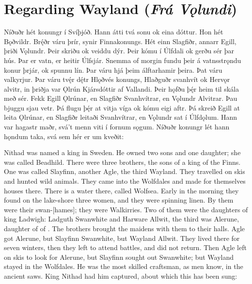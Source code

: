\sectionline

\section{Regarding Wayland (\emph{Frá Vǫlundi})}

\bpg\bpa Níðuðr hét konungr í Svíþjóð.
Hann átti tvá sonu ok eina dóttur. Hon hét Bǫðvildr.
Brę́ðr váru þrír, synir Finnakonungs.
Hét einn Slagfiðr, annarr Egill, þriði Vǫlundr.
Þeir skriðu ok veiddu dýr. Þeir kómu í Úlfdali ok gerðu sér þar hús.
Þar er vatn, er heitir Úlfsjár.
Snemma of morgin fundu þeir á vatnsstrǫndu konur þrjár, ok spunnu lín.
Þar váru hjá þeim álftarhamir þeira. Þat váru valkyrjur.
Þar váru tvę́r dę́tr Hlǫðvés konungs, Hlaðguðr svanhvít ok Hervǫr alvitr, in þriðja var Ǫlrún Kjársdóttir af Vallandi.
Þeir hǫfðu þę́r heim til skála með sér. Fekk Egill Ǫlrúnar, en Slagfiðr Svanhvítrar, en Vǫlundr Alvitrar.
Þau bjuggu sjau vetr. Þá flugu þę́r at vitja víga ok kómu eigi aftr.
Þá skreið Egill at leita Ǫlrúnar, en Slagfiðr leitaði Svanhvítrar, en Vǫlundr sat í Úlfdǫlum.
Hann var hagastr maðr, svá’t menn viti í fornum sǫgum.
Níðuðr konungr lét hann hǫndum taka, svá sem hér er um kveðit:\epa

\bpb Nithad was named a king in Sweden.
He owned two sons and one daughter; she was called Beadhild.
There were three brothers, the sons of a king of the Finns.
One was called Slayfinn, another Agle, the third Wayland.
They travelled on skis and hunted wild animals. They came into the Wolfdales and made for themselves houses there.
There is a water there, called Wolfsea.
Early in the morning they found on the lake-shore three women, and they were spinning linen.
By them were their swan-[hames]; they were Walkirries.
Two of them were the daughters of king Ladwigh: Ladguth Swanwhite and Harware Allwit, the third was Alerune, daughter of  of .
The brothers brought the maidens with them to their halls. Agle got Alerune, but Slayfinn Swanwhite, but Wayland Allwit.
They lived there for seven winters, then they left to attend battles, and did not return.
Then Agle left on skis to look for Alerune, but Slayfinn sought out Swanwhite; but Wayland stayed in the Wolfdales.
He was the most skilled craftsman, as men know, in the ancient saws.
King Nithad had him captured, about which this has been sung:\epb\epg

\sectionline

